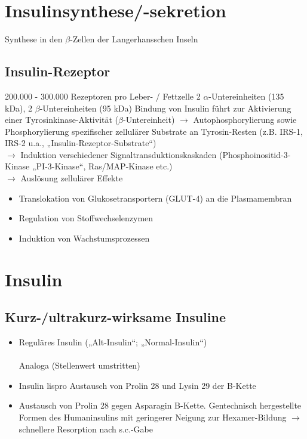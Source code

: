 \documentclass[10pt,a4paper]{report}
\begin{document}
\section{Insulinsynthese/-sekretion} %
\label{sec:insulinsynthese_sekretion}
Synthese in den $\beta$-Zellen der Langerhansschen Inseln
\subsection{Insulin-Rezeptor} %
\label{ssub:insulin_rezeptor}
200.000 - 300.000 Rezeptoren pro Leber- / Fettzelle
2 $\alpha$-Untereinheiten (135 kDa), 2 $\beta$-Untereinheiten (95 kDa)
Bindung von Insulin führt zur Aktivierung einer Tyrosinkinase-Aktivität ($\beta$-Untereinheit) $\rightarrow$ Autophosphorylierung sowie Phosphorylierung spezifischer zellulärer Substrate an Tyrosin-Resten (z.B. IRS-1, IRS-2 u.a., „Insulin-Rezeptor-Substrate“)\\
$\rightarrow$ 	Induktion verschiedener Signaltransduktionskaskaden (Phosphoinositid-3-Kinase „PI-3-Kinase“, Ras/MAP-Kinase etc.) \\
$\rightarrow$ 	Auslösung zellulärer Effekte
\begin{itemize}
	\item  Translokation von Glukosetransportern (GLUT-4) an die Plasmamembran 
	\item Regulation von Stoffwechselenzymen
	\item  Induktion von Wachstumsprozessen
\end{itemize}

\section{Insulin} %
\label{sec:insulin}
\subsection{Kurz-/ultrakurz-wirksame Insuline} %
\label{ssub:kurz_ultrakurz_wirksame_insuline}
\begin{itemize}
	\item Reguläres Insulin („Alt-Insulin“; „Normal-Insulin“) \\ \\
	Analoga (Stellenwert umstritten)
	\item Insulin lispro Austausch von Prolin 28 und Lysin 29 der B-Kette
	\item Austausch von Prolin 28 gegen Asparagin B-Kette. Gentechnisch hergestellte Formen des Humaninsulins mit geringerer Neigung zur Hexamer-Bildung $\rightarrow$ schnellere Resorption nach s.c.-Gabe
\end{itemize}
\end{document}
